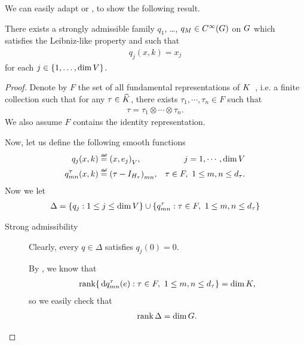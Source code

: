 We can easily adapt \cite[Lemma 4.4]{RuzhanskyTurunenWirth10} or \cite[Corollay 5.13]{Fischer2015},
to show the following result.

\begin{lemma}
\label{lemma:choice_of_polynomials}
    There exists a strongly admissible family $q_1$, \dots, $q_M \in {C^\infty(G)}$ on $G$ which satisfies the Leibniz-like property and such that
    \begin{align*}
        q_j(x, k) = x_j
    \end{align*}
    for each $j \in \{1, \dots, \dim V\}$.
\end{lemma}
\begin{proof}
    Denote by $F$ the set of all fundamental representations of $K$~\cite[p. 3416]{Fischer2015},
    i.e. a finite collection such that for any $\tau \in {\widehat{K}}$,
    there exists $\tau_1, \cdots, \tau_n \in F$ such that
    \begin{align*}
        \tau = \tau_1 \otimes \cdots \otimes \tau_n.
    \end{align*}
    We also assume $F$ contains the identity representation.

    Now,
    let us define the following smooth functions
    \begin{align*}
        q_j(x, k) &\defeq \ip {x} {e_j}, &j = 1, \cdots, \dim \VectorSpace\\
        q^\tau_{m n}(x, k) &\defeq {\left(\tau - \Id {H_\tau}\right)}_{m n},
        &\tau \in F, \ 1 \leq m, n \leq \dimRep \tau.
    \end{align*}
    Now we let
    \begin{align*}
        \Delta = \{q_j : 1 \leq j \leq \dim V\}
        \cup \{q^\tau_{m n} : \tau \in F, \ 1 \leq m, n \leq {d_{\tau}}\}
    \end{align*}

    \begin{description}
        \item [Strong admissibility]
            Clearly, every $q \in \Delta$ satisfies $q_j(0) = 0$.

            By \cite[Lemma 5.11]{Fischer2015},
            we know that
            \begin{align*}
                \operatorname{rank} \{\,\mathrm{d} q^\tau_{m n}(e) : \tau \in F, \ 1 \leq m, n \leq {d_{\tau}}\} = \dim K,
            \end{align*}
            so we easily check that
            \begin{align*}
                \operatorname{rank} \Delta = \dim G.
            \end{align*}


\end{description}
\end{proof}
